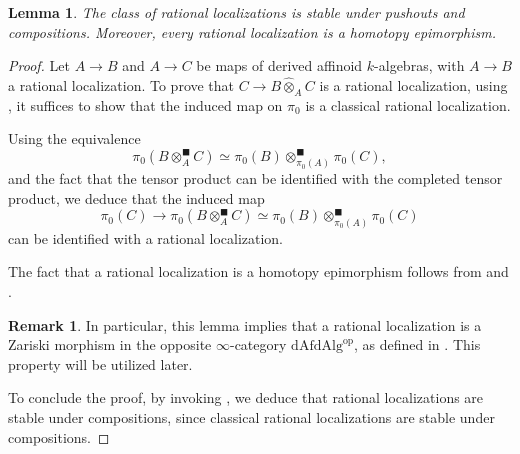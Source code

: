 \documentclass[oneside, hidelinks, 12pt, a4paper,reqno]{amsart}
\theoremstyle{plain}
\theoremstyle{definition}
\newtheorem{remark}[remark]{Remark}
\theoremstyle{plain}
\newtheorem{lemma}[lemma]{Lemma}
\newcommand{\cat}{$\infty$-category }
\newcommand{\Solid}{\blacksquare}
\begin{document}
\begin{lemma}
    The class of rational localizations is stable under pushouts and compositions. Moreover, every rational localization is a homotopy epimorphism.
\end{lemma}
\begin{proof}
Let $A \to B$ and $A \to C$ be maps of derived affinoid $k$-algebras, with $A \to B$ a rational localization. To prove that $C \to B\widehat{\otimes}_A C$ is a rational localization, using \cite[Proposition 2.29]{mikami2023fppfdescentcondensedanimatedrings}, it suffices to show that the induced map on $\pi_0$ is a classical rational localization.

Using the equivalence
    \[
    \pi_{0}(B\otimes^{\Solid}_{A}C) \simeq \pi_{0}(B)\otimes^{\Solid}_{\pi_{0}(A)} \pi_{0}(C),
    \]
    and the fact that the tensor product can be identified with the completed tensor product, we deduce that the induced map 
    \[
    \pi_{0}(C) \to \pi_{0}(B\otimes^{\Solid}_{A}C) \simeq \pi_{0}(B)\otimes^{\Solid}_{\pi_{0}(A)} \pi_{0}(C)
    \]
    can be identified with a rational localization.

The fact that a rational localization is a homotopy epimorphism follows from \cite[Lemma 2.27]{mikami2023fppfdescentcondensedanimatedrings} and \cite[Exercise 12.17]{analytic}. 

\begin{remark}
    In particular, this lemma implies that a rational localization is a Zariski morphism in the opposite \cat $\mathrm{dAfdAlg}^{\mathrm{op}}$, as defined in \cite[Definition 1.3.4]{montagnani2025axiomaticapproachanalytic1affineness}. This property will be utilized later. 
\end{remark}
    
To conclude the proof, by invoking \cite[Proposition 2.29]{mikami2023fppfdescentcondensedanimatedrings}, we deduce that rational localizations are stable under compositions, since classical rational localizations are stable under compositions.
\end{proof}
\end{document}

